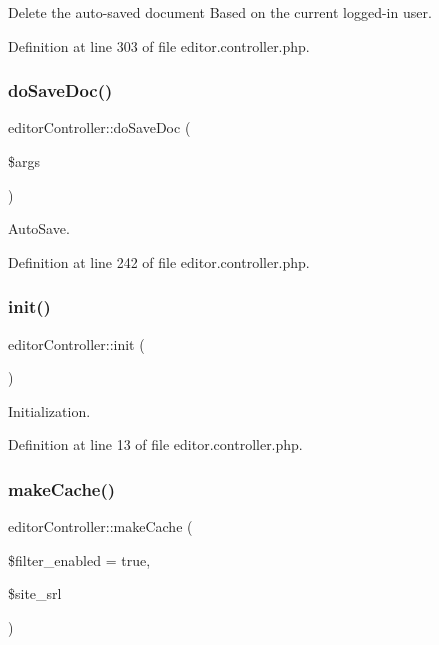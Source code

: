 Delete the auto-\/saved document Based on the current logged-\/in user. 



Definition at line 303 of file editor.\+controller.\+php.

\hypertarget{classeditorController_a9e5a3fdca13b5ac5c507964fbcd74d35}{}\label{classeditorController_a9e5a3fdca13b5ac5c507964fbcd74d35} 
\subsubsection{\texorpdfstring{do\+Save\+Doc()}{doSaveDoc()}}
{\footnotesize\ttfamily editor\+Controller\+::do\+Save\+Doc (\begin{DoxyParamCaption}\item[{}]{\$args }\end{DoxyParamCaption})}



Auto\+Save. 



Definition at line 242 of file editor.\+controller.\+php.

\hypertarget{classeditorController_a40838d463bafa5863b5f966b8828738b}{}\label{classeditorController_a40838d463bafa5863b5f966b8828738b} 
\subsubsection{\texorpdfstring{init()}{init()}}
{\footnotesize\ttfamily editor\+Controller\+::init (\begin{DoxyParamCaption}{ }\end{DoxyParamCaption})}



Initialization. 



Definition at line 13 of file editor.\+controller.\+php.

\hypertarget{classeditorController_a246bf423c2f25208758a5cbcd2ba9890}{}\label{classeditorController_a246bf423c2f25208758a5cbcd2ba9890} 
\subsubsection{\texorpdfstring{make\+Cache()}{makeCache()}}
{\footnotesize\ttfamily editor\+Controller\+::make\+Cache (\begin{DoxyParamCaption}\item[{}]{\$filter\+\_\+enabled = {\ttfamily true},  }\item[{}]{\$site\+\_\+srl }\end{DoxyParamCaption})}



